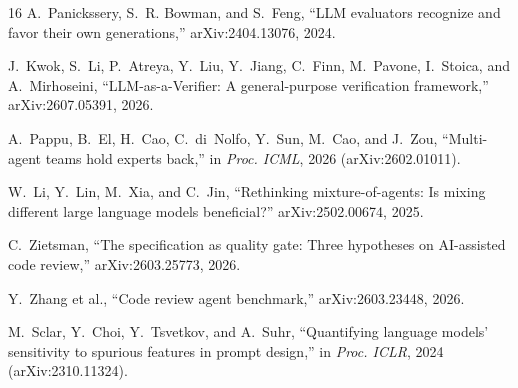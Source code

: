 \documentclass[conference]{IEEEtran}
\begin{document}
\begin{thebibliography}{16}
A.~Panickssery, S.~R. Bowman, and S.~Feng, ``LLM evaluators recognize and
favor their own generations,'' arXiv:2404.13076, 2024.

J.~Kwok, S.~Li, P.~Atreya, Y.~Liu, Y.~Jiang, C.~Finn, M.~Pavone, I.~Stoica,
and A.~Mirhoseini, ``LLM-as-a-Verifier: A general-purpose verification
framework,'' arXiv:2607.05391, 2026.

A.~Pappu, B.~El, H.~Cao, C.~di~Nolfo, Y.~Sun, M.~Cao, and J.~Zou,
``Multi-agent teams hold experts back,'' in \emph{Proc. ICML}, 2026
(arXiv:2602.01011).

W.~Li, Y.~Lin, M.~Xia, and C.~Jin, ``Rethinking mixture-of-agents: Is
mixing different large language models beneficial?'' arXiv:2502.00674,
2025.

C.~Zietsman, ``The specification as quality gate: Three hypotheses on
AI-assisted code review,'' arXiv:2603.25773, 2026.

Y.~Zhang et al., ``Code review agent benchmark,'' arXiv:2603.23448, 2026.

M.~Sclar, Y.~Choi, Y.~Tsvetkov, and A.~Suhr, ``Quantifying language models'
sensitivity to spurious features in prompt design,'' in \emph{Proc. ICLR},
2024 (arXiv:2310.11324).

\end{thebibliography}
\end{document}
